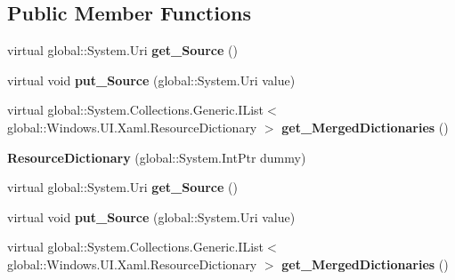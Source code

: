 \subsection*{Public Member Functions}
\begin{DoxyCompactItemize}
\item 
\mbox{\label{class_windows_1_1_u_i_1_1_xaml_1_1_resource_dictionary_a8377dec4bb445706e6660da622358e2f}} 
virtual global\+::\+System.\+Uri {\bfseries get\+\_\+\+Source} ()
\item 
\mbox{\label{class_windows_1_1_u_i_1_1_xaml_1_1_resource_dictionary_aa192ade6e6b72c6129bf8ff27c6be96f}} 
virtual void {\bfseries put\+\_\+\+Source} (global\+::\+System.\+Uri value)
\item 
\mbox{\label{class_windows_1_1_u_i_1_1_xaml_1_1_resource_dictionary_ae4c33952a20ac36d63cbc631d1198e6a}} 
virtual global\+::\+System.\+Collections.\+Generic.\+I\+List$<$ global\+::\+Windows.\+U\+I.\+Xaml.\+Resource\+Dictionary $>$ {\bfseries get\+\_\+\+Merged\+Dictionaries} ()
\item 
\mbox{\label{class_windows_1_1_u_i_1_1_xaml_1_1_resource_dictionary_a0cbfb902f5ff2e6c1f1eb1afb0bca04c}} 
{\bfseries Resource\+Dictionary} (global\+::\+System.\+Int\+Ptr dummy)
\item 
\mbox{\label{class_windows_1_1_u_i_1_1_xaml_1_1_resource_dictionary_a8377dec4bb445706e6660da622358e2f}} 
virtual global\+::\+System.\+Uri {\bfseries get\+\_\+\+Source} ()
\item 
\mbox{\label{class_windows_1_1_u_i_1_1_xaml_1_1_resource_dictionary_aa192ade6e6b72c6129bf8ff27c6be96f}} 
virtual void {\bfseries put\+\_\+\+Source} (global\+::\+System.\+Uri value)
\item 
\mbox{\label{class_windows_1_1_u_i_1_1_xaml_1_1_resource_dictionary_ae4c33952a20ac36d63cbc631d1198e6a}} 
virtual global\+::\+System.\+Collections.\+Generic.\+I\+List$<$ global\+::\+Windows.\+U\+I.\+Xaml.\+Resource\+Dictionary $>$ {\bfseries get\+\_\+\+Merged\+Dictionaries} ()

\end{DoxyCompactItemize}
